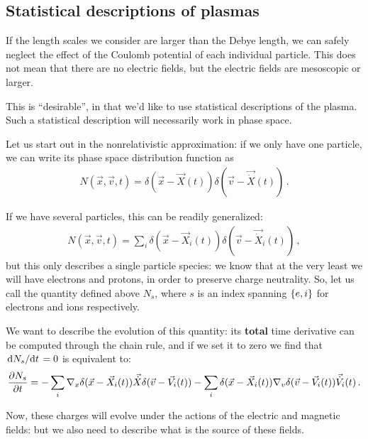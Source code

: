 \documentclass[main.tex]{subfiles}
\begin{document}
\subsection{Statistical descriptions of plasmas}


If the length scales we consider are larger than the Debye length, we can safely neglect the effect of the Coulomb potential of each individual particle. 
This does not mean that there are no electric fields, but the electric fields are mesoscopic or larger. 

This is ``desirable'', in that we'd like to use statistical descriptions of the plasma.
Such a statistical description will necessarily work in phase space. 

Let us start out in the nonrelativistic approximation: if we only have one particle, we can write its phase space distribution function as 
%
\begin{align}
N(\vec{x}, \vec{v}, t) = \delta (\vec{x} - \vec{X}(t)) \delta (\vec{v} - \vec{\dot{X}}(t))
\,.
\end{align}

If we have several particles, this can be readily generalized: 
%
\begin{align}
N(\vec{x}, \vec{v}, t) =
\sum _{i} \delta (\vec{x} - \vec{X}_i(t)) \delta (\vec{v} - \vec{\dot{X}}_i(t))
\,,
\end{align}
%
but this only describes a single particle species: we know that at the very least we will have electrons and protons, in order to preserve charge neutrality. 
So, let us call the quantity defined above \(N_s\), where \(s\) is an index spanning \(\qty{e, i}\) for electrons and ions respectively. 

We want to describe the evolution of this quantity: its \textbf{total} time derivative can be computed through the chain rule, and if we set it to zero we find that \(\dv*{N_s}{t} = 0\) is equivalent to:
%
\begin{align}
\pdv{N_s}{t} (\vec{x}, \vec{v}, t) = 
- \sum _{i} \nabla_x \delta (\vec{x} - \vec{X}_i(t)) \vec{\dot{X}} \delta (\vec{v} - \vec{V}_i (t) ) 
- \sum _{i} \delta (\vec{x} - \vec{X}_i(t)) \nabla_v \delta (\vec{v} - \vec{V}_i(t)) \vec{\dot{V}}_i(t)
\,.
\end{align}

Now, these charges will evolve under the actions of the electric and magnetic fields: but we also need to describe what is the source of these fields. 
\end{document}
